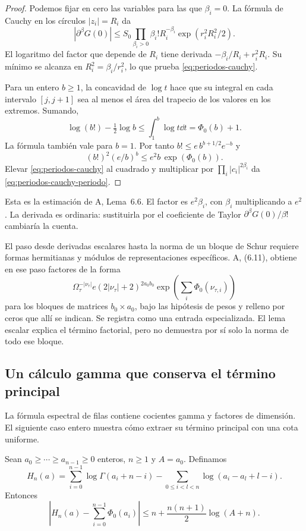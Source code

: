 \begin{proof}
Podemos fijar en cero las variables para las que $\beta_i=0$.
La fórmula de Cauchy en los círculos $|z_i|=R_i$ da
\[
 |\partial^\beta G(0)|
 \le S_0\prod_{\beta_i>0}
       \beta_i!R_i^{-\beta_i}\exp(r_i^2R_i^2/2).
\]
El logaritmo del factor que depende de $R_i$ tiene derivada
$-\beta_i/R_i+r_i^2R_i$. Su mínimo se alcanza en
$R_i^2=\beta_i/r_i^2$, lo que prueba
\eqref{eq:periodos-cauchy}.

Para un entero $b\ge1$, la concavidad de $\log t$ hace que su
integral en cada intervalo $[j,j+1]$ sea al menos el área del
trapecio de los valores en los extremos. Sumando,
\[
 \log(b!)-\tfrac12\log b
 \le\int_1^b\log t\dd t=\Phi_0(b)+1.
\]
La fórmula también vale para $b=1$. Por tanto
$b!\le e\,b^{b+1/2}e^{-b}$ y
\[
 (b!)^2(e/b)^b\le e^2b\,\exp(\Phi_0(b)).
\]
Elevar \eqref{eq:periodos-cauchy} al cuadrado y multiplicar por
$\prod_i|c_i|^{2\beta_i}$ da
\eqref{eq:periodos-cauchy-periodo}.
\end{proof}

Esta es la estimación de A, Lema~6.6. El factor es
$e^2\beta_i$, con $\beta_i$ multiplicando a $e^2$.
La derivada es ordinaria: sustituirla por el coeficiente de Taylor
$\partial^\beta G(0)/\beta!$ cambiaría la cuenta.

El paso desde derivadas escalares hasta la norma de un bloque de
Schur requiere formas hermitianas y módulos de representaciones
específicos. A, (6.11), obtiene en ese paso factores de la forma
\[
 \Omega_\tau^{-|\nu_\tau|}
 e(2|\nu_\tau|+2)^{2a_0b_0}
 \exp\left(\sum_i\Phi_0(\nu_{\tau,i})\right)
\]
para los bloques de matrices $b_0\times a_0$, bajo las hipótesis de
pesos y relleno por ceros que allí se indican. Se registra como una
entrada especializada. El lema escalar explica el término factorial,
pero no demuestra por sí solo la norma de todo ese bloque.

\subsection{Un cálculo gamma que conserva el término principal}

La fórmula espectral de filas contiene cocientes gamma y factores
de dimensión. El siguiente caso entero muestra cómo extraer su
término principal con una cota uniforme.

\begin{lema}
Sean $a_0\ge\cdots\ge a_{n-1}\ge0$ enteros, $n\ge1$ y $A=a_0$.
Definamos
\[
 H_n(a)=\sum_{i=0}^{n-1}\log\Gamma(a_i+n-i)
       -\sum_{0\le i<l<n}\log(a_i-a_l+l-i).
\]
Entonces
\begin{equation}
 \left|H_n(a)-\sum_{i=0}^{n-1}\Phi_0(a_i)\right|
 \le n+\frac{n(n+1)}2\log(A+n).
 \label{eq:periodos-gamma}
\end{equation}
\label{lem:periodos-gamma}
\end{lema}

